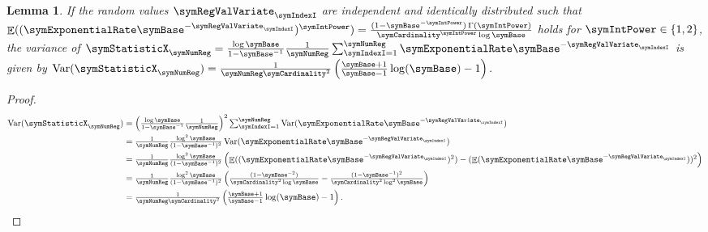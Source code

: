 \documentclass[sigconf, nonacm]{acmart}
\newtheorem{lemma}{Lemma}
\DeclareMathOperator*{\symVariance}{Var}
\DeclareMathOperator*{\symExpectation}{\mathbb{E}}
\begin{document}
\begin{lemma}
\label{lem:card_variance}
If the random values $\symRegValVariate_\symIndexI$ are independent and identically distributed such that $\symExpectation((\symExponentialRate \symBase^{-\symRegValVariate_\symIndexI})^\symIntPower) = \frac{(1-\symBase^{-\symIntPower})\,\Gamma(\symIntPower)}{\symCardinality^\symIntPower \log \symBase}$ holds for $\symIntPower\in\lbrace 1,2\rbrace$, the variance of $\symStatisticX_\symNumReg = \frac{\log \symBase}{1-\symBase^{-1}}\frac{1}{\symNumReg}\sum_{\symIndexI=1}^\symNumReg \symExponentialRate \symBase^{-\symRegValVariate_\symIndexI}$ is given by $\symVariance(\symStatisticX_\symNumReg) = \frac{1}{\symNumReg\symCardinality^2}\left(\frac{\symBase+1}{\symBase-1}\log(\symBase) - 1\right)$.
\end{lemma}
\begin{proof}
\begin{align*}
\symVariance(\symStatisticX_\symNumReg) &= 
\textstyle
\left(\frac{\log \symBase}{1-\symBase^{-1}}\frac{1}{\symNumReg}\right)^2
\sum_{\symIndexI=1}^\symNumReg
\symVariance(\symExponentialRate \symBase^{-\symRegValVariate_\symIndexI})
\\
&=
\textstyle
\frac{1}{\symNumReg}\frac{\log^2 \symBase}{(1-\symBase^{-1})^2}
\symVariance(\symExponentialRate \symBase^{-\symRegValVariate_\symIndexI})
\\
&=
\textstyle
\frac{1}{\symNumReg}\frac{\log^2 \symBase}{(1-\symBase^{-1})^2}
\left(\symExpectation((\symExponentialRate \symBase^{-\symRegValVariate_\symIndexI})^2)
-
(\symExpectation(\symExponentialRate \symBase^{-\symRegValVariate_\symIndexI}))^2
\right)
\\
&=
\textstyle
\frac{1}{\symNumReg}\frac{\log^2 \symBase}{(1-\symBase^{-1})^2}
\left(
\frac{(1-\symBase^{-2})}{\symCardinality^2 \log \symBase}
-
\frac{(1-\symBase^{-1})^2}{\symCardinality^2 \log^2 \symBase}
\right)
\\
&=
\textstyle
\frac{1}{\symNumReg\symCardinality^2}\left(\frac{\symBase+1}{\symBase-1}\log(\symBase) - 1\right).
\end{align*}
\end{proof}
\end{document}

